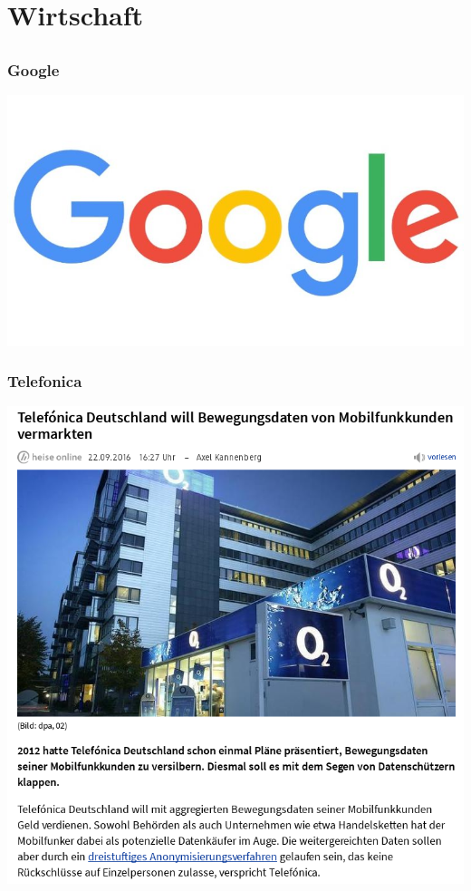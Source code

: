 \documentclass[12pt]{beamer}
\begin{document}
\section{Wirtschaft}
\subsection{}

\begin{frame}
  \frametitle{Google}
  \begin{center}
    \includegraphics[height=0.4\textheight]{img/google.jpg}
  \end{center}
\end{frame}

\begin{frame}
  \frametitle{Telefonica}
  \pause
  \begin{center}
    \includegraphics[height=0.7\textheight]{img/telefonica.png}
  \end{center}
\end{frame}
\end{document}
